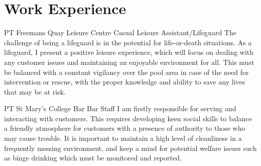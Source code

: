 \documentclass[10pt]{article} %
\begin{document}
\begin{paracol}{2}
\begin{supertabular}{rp{6.7cm}}

\end{supertabular}


\vspace{-\baselineskip}\medskip %


\section{Work Experience}





{PT} %
{Freemans Quay Leisure Centre} %
{Casual Leisure Assistant/Lifeguard} %
{The challenge of being a lifeguard is in the potential for life-or-death situations. As a lifeguard, I present a positive leisure experience, which will focus on dealing with any customer issues and maintaining an enjoyable environment for all. This must be balanced with a constant vigilancy over the pool area in case of the need for intervention or rescue, with the proper knowledge and ability to save any lives that may be at risk.} %


\vspace{-10pt}
{PT} %
{St Mary's College Bar} %
{Bar Staff} %
{I am firstly responsible for serving and interacting with customers. This requires developing keen social skills to balance a friendly atmosphere for customers with a presence of authority to those who may cause trouble. It is important to maintain a high level of cleanliness in a frequently messing environment, and keep a mind for potential welfare issues such as binge drinking which must be monitored and reported.}  %


\end{paracol}
\end{document}
